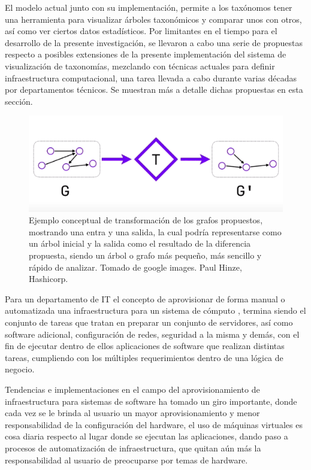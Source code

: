 \documentclass[journal]{IEEEtran}
\begin{document}
El modelo actual junto con su implementación, permite a los taxónomos tener una herramienta para visualizar árboles taxonómicos y comparar unos con otros, así como ver ciertos datos estadísticos. Por limitantes en el tiempo para el desarrollo de la presente investigación, se llevaron a cabo una serie de propuestas respecto a posibles extensiones de la presente implementación del sistema de visualización de taxonomías, mezclando con técnicas actuales para definir infraestructura computacional, una tarea llevada a cabo durante varias décadas por departamentos técnicos. Se muestran más a detalle dichas propuestas en esta sección.

\begin{figure}[]
  \centering
  \includegraphics[scale=0.9]{graph-theory.png}
  \caption{Ejemplo conceptual de transformación de los grafos propuestos, mostrando una entra y una salida, la cual podría representarse como un árbol inicial y la salida como el resultado de la diferencia propuesta, siendo un árbol o grafo más pequeño, más sencillo y rápido de analizar. Tomado de google images. Paul Hinze, Hashicorp.}
\end{figure}

Para un departamento de IT el concepto de aprovisionar de forma manual o automatizada una infraestructura para un sistema de cómputo \cite{aut-cloud-prov}, termina siendo el conjunto de tareas que tratan en preparar un conjunto de servidores, así como software adicional, configuración de redes, seguridad a la misma y demás, con el fin de ejecutar dentro de ellos aplicaciones de software que realizan distintas tareas, cumpliendo con los múltiples requerimientos dentro de una lógica de negocio.

Tendencias e implementaciones en el campo del aprovisionamiento de infraestructura para sistemas de software ha tomado un giro importante, donde cada vez se le brinda al usuario un mayor aprovisionamiento y menor responsabilidad de la configuración del hardware, el uso de máquinas virtuales \cite{virt-machines} es cosa diaria respecto al lugar donde se ejecutan las aplicaciones, dando paso a procesos de automatización de infraestructura, que quitan aún más la responsabilidad al usuario de preocuparse por temas de hardware.
\end{document}
